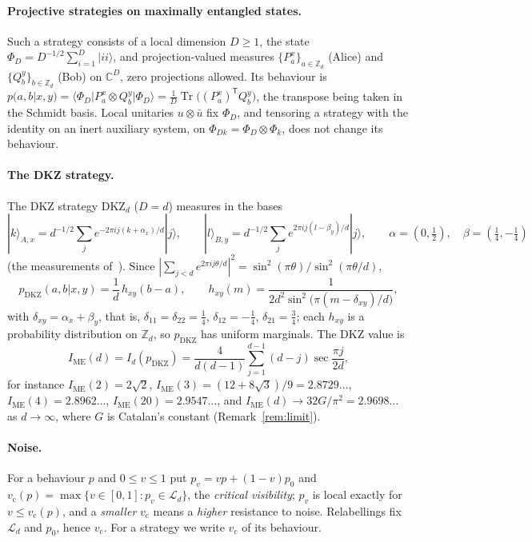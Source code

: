 \documentclass[11pt]{article}
\theoremstyle{remark}
\numberwithin{equation}{section}
\newcommand{\Z}{\mathbb{Z}}
\newcommand{\C}{\mathbb{C}}
\newcommand{\Tr}{\operatorname{Tr}}
\newcommand{\IME}{I_{\mathrm{ME}}}
\newcommand{\cL}{\mathcal{L}}
\newcommand{\vc}{v_{\mathrm c}}
\newcommand{\DKZ}{\mathrm{DKZ}}
\begin{document}
\paragraph{Projective strategies on maximally entangled states.}
Such a strategy consists of a local dimension $D\ge1$, the state $\Phi_D=D^{-1/2}\sum_{i=1}^D|ii\rangle$, and
projection-valued measures $\{P^x_a\}_{a\in\Z_d}$ (Alice) and $\{Q^y_b\}_{b\in\Z_d}$ (Bob) on $\C^D$, zero projections
allowed. Its behaviour is $p(a,b|x,y)=\langle\Phi_D|P^x_a\otimes Q^y_b|\Phi_D\rangle=\frac1D\Tr\bigl((P^x_a)^{\mathsf
T}Q^y_b\bigr)$, the transpose being taken in the Schmidt basis. Local unitaries $u\otimes\bar u$ fix $\Phi_D$, and
tensoring a strategy with the identity on an inert auxiliary system, on $\Phi_{Dk}=\Phi_D\otimes\Phi_k$, does not change
its behaviour.

\paragraph{The DKZ strategy.}
The DKZ strategy $\DKZ_d$ ($D=d$) measures in the bases
\[
|k\rangle_{A,x}=d^{-1/2}\sum_je^{-2\pi ij(k+\alpha_x)/d}|j\rangle,\qquad|l\rangle_{B,y}=d^{-1/2}\sum_je^{2\pi ij(l-\beta_y)/d}|j\rangle,
\qquad\alpha=(0,\tfrac12),\quad\beta=(\tfrac14,-\tfrac14)
\]
(the measurements of~\cite[eqs.~(12)--(15)]{CGLMP}). Since
$|\sum_{j<d}e^{2\pi ij\theta/d}|^2=\sin^2(\pi\theta)/\sin^2(\pi\theta/d)$,
\begin{equation}\label{eq:dkzclosed}
p_{\DKZ}(a,b|x,y)=\frac1d\,h_{xy}(b-a),\qquad h_{xy}(m)=\frac1{2d^2\sin^2\bigl(\pi(m-\delta_{xy})/d\bigr)},
\end{equation}
with $\delta_{xy}=\alpha_x+\beta_y$, that is, $\delta_{11}=\delta_{22}=\frac14$, $\delta_{12}=-\frac14$, $\delta_{21}=\frac34$;
each $h_{xy}$ is a probability distribution on $\Z_d$, so $p_{\DKZ}$ has uniform marginals. The DKZ value
is~\cite{DKZ,CGLMP}
\begin{equation}\label{eq:IME}
\IME(d)=I_d(p_{\DKZ})=\frac{4}{d(d-1)}\sum_{j=1}^{d-1}(d-j)\sec\frac{\pi j}{2d},
\end{equation}
for instance $\IME(2)=2\sqrt2$, $\IME(3)=(12+8\sqrt3)/9=2.8729\ldots$, $\IME(4)=2.8962\ldots$, $\IME(20)=2.9547\ldots$, and
$\IME(d)\to32G/\pi^2=2.9698\ldots$ as $d\to\infty$, where $G$ is Catalan's constant (Remark~\ref{rem:limit}).

\paragraph{Noise.}
For a behaviour $p$ and $0\le v\le1$ put $p_v=vp+(1-v)p_0$ and $\vc(p)=\max\{v\in[0,1]:p_v\in\cL_d\}$, the
\emph{critical visibility}; $p_v$ is local exactly for $v\le\vc(p)$, and a \emph{smaller} $\vc$ means a \emph{higher}
resistance to noise. Relabellings fix $\cL_d$ and $p_0$, hence $\vc$. For a strategy we write $\vc$ of its behaviour.
\end{document}
